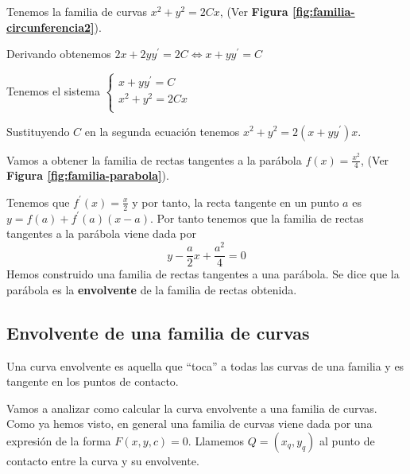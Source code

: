 \documentclass{mathnotes}
\begin{document}
\begin{example}
Tenemos la familia de curvas $x^2+y^2=2Cx$, (Ver \textbf{Figura \ref{fig:familia-circunferencia2}}).

Derivando obtenemos $2x+2yy^\prime = 2C \iff x+yy^\prime = C$

Tenemos el sistema 
$
  \left\lbrace
  \begin{array}{l}
  	 x+yy^\prime = C \\
     x^2+y^2=2Cx \\
  \end{array}
  \right.
$

Sustituyendo $C$ en la segunda ecuación tenemos $x^2+y^2 = 2(x + yy^\prime)x$.
\end{example}

\begin{example}
Vamos a obtener la familia de rectas tangentes a la parábola $f(x)=\frac{x^2}{4}$, (Ver \textbf{Figura \ref{fig:familia-parabola}}).

Tenemos que $f^\prime(x) =  \frac{x}{2}$ y por tanto, la recta tangente en un punto $a$ es $y=f(a)+f^\prime(a)(x-a)$. Por tanto tenemos que la familia de rectas tangentes a la parábola viene dada por $$y-\frac{a}{2}x + \frac{a^2}{4} = 0$$
Hemos construido una familia de rectas tangentes a una parábola. Se dice que la parábola es la \textbf{envolvente} de la familia de rectas obtenida.
\end{example}

\subsection{Envolvente de una familia de curvas}

\begin{definition}
Una curva envolvente es aquella que ``toca'' a todas las curvas de una familia y es tangente en los puntos de contacto.
\end{definition}


Vamos a analizar como calcular la curva envolvente a una familia de curvas.
Como ya hemos visto, en general una familia de curvas viene dada por una expresión de la forma $F(x,y,c) = 0$. Llamemos $Q=(x_q, y_q)$ al punto de contacto entre la curva y su envolvente.
\end{document}
